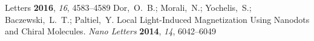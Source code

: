 \documentclass[journal=nalefd,manuscript=article,layout=twocolumn]{achemso}
\begin{document}
\begin{mcitethebibliography}{48}
{  Letters} \textbf{2016}, \emph{16}, 4583--4589\relax
\mciteBstWouldAddEndPuncttrue
\mciteSetBstMidEndSepPunct{\mcitedefaultmidpunct}
{\mcitedefaultendpunct}{\mcitedefaultseppunct}\relax
\EndOfBibitem
{}
Dor,~O.~B.; Morali,~N.; Yochelis,~S.; Baczewski,~L.~T.; Paltiel,~Y. Local
  Light-Induced Magnetization Using Nanodots and Chiral Molecules. \emph{Nano
  Letters} \textbf{2014}, \emph{14}, 6042--6049\relax
\mciteBstWouldAddEndPuncttrue
\mciteSetBstMidEndSepPunct{\mcitedefaultmidpunct}
{\mcitedefaultendpunct}{\mcitedefaultseppunct}\relax
\EndOfBibitem
\end{mcitethebibliography}


\end{document}
